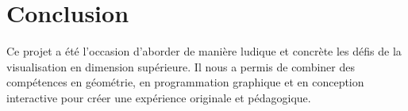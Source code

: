 \documentclass[11pt,a4paper]{article}
\begin{document}
\section{Conclusion}

Ce projet a été l’occasion d’aborder de manière ludique et concrète les défis de la visualisation en dimension supérieure. Il nous a permis de combiner des compétences en géométrie, en programmation graphique et en conception interactive pour créer une expérience originale et pédagogique.
\end{document}
